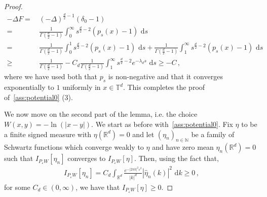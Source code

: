 \documentclass[a4paper,10pt,twoside]{amsart}
\newcommand{\dx}[1]{\,\mathrm{d}#1}  %
\theoremstyle{remark}
\theoremstyle{definition}
\numberwithin{equation}{section}
\newcommand{\T}{\mathbb{T}}
\newcommand{\eps}{\varepsilon}
\newcommand{\N}{\mathbb{N}}
\newcommand{\R}{\mathbb{R}}
\newcommand{\0}{{\bf 0}}
\newcommand{\+}{\hspace{-.5ex}+\hspace{-.5ex}}
\begin{document}
\begin{proof}
  \begin{align}
      -\Delta F = & \, (-\Delta)^{\frac d2-1} (\delta_0 -1)\\
      = &\,\frac{1}{\Gamma(\frac d2 -1)}\int_0^\infty s^{\frac d2 -2} (p_s(x)-1) \, \dx{s}\\
      = & \, \frac{1}{\Gamma(\frac d2 -1)}\int_0^1 s^{\frac d2 -2} (p_s(x)-1) \, \dx{s} + \frac{1}{\Gamma(\frac d2 -1)}\int_1^\infty s^{\frac d2 -2} (p_s(x)-1) \, \dx{s} \, \\
      \geq &\, \frac{1}{\Gamma(\frac d2 -1)} - C_d\frac{1}{\Gamma(\frac d2 -1)}\int_1^\infty s^{\frac d2 -2} e^{-\lambda_d s} \, \dx{s}\geq -C\, ,
  \end{align}
  where we have used both that $p_s$ is non-negative and that it converges exponentially to $1$ uniformly in $x\in \T^d$. This completes the proof of~\cref{ass:potential0} (3).

  

   
  We now move on the second part of the lemma, i.e. the choice $W(x,y)=-\ln(|x-y|)$. We start as before with~\cref{ass:potential0}.  Fix $\eta$ to be a finite signed measure with $\eta(\R^d)=0$ and let $(\eta_n)_{n \in \N}$ be a family of Schwartz functions which converge weakly to $\eta$ and have zero mean $\eta_n(\R^d)=0$ such that $I_{P_\eps W}[\eta_n]$ converges to $I_{P_\eps W}[\eta]$. Then, using the fact that,
  \begin{align}
    I_{P_\eps W}[\eta_n]=C_d\int_{\R^d}\frac{e^{-|2\pi k |^2 \eps^2}}{|k|^{d}}|\hat{\eta}_n(k)|^2 \, \dx{k} \geq 0\, ,
  \end{align}
  for some $C_d\in (0,\infty)$, we have that $I_{P_\eps W}[\eta]\geq 0$.


\end{proof}
\end{document}
